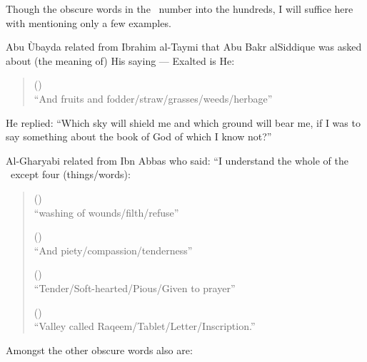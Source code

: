 \documentclass[12pt]{memoir}
\begin{document}
Though the obscure words in the \Quran\ number into the hundreds,
I will suffice here with mentioning only a few examples.

Abu \`Ubayda related from Ibrahim al-Taymi that Abu Bakr al\–Siddique
was asked about (the meaning of) His saying — Exalted is He:

\begin{quote}
() \\
“And fruits and fodder/straw/grasses/weeds/herbage”
\end{quote}

He replied: “Which sky will shield me and which ground will bear me,
if I was to say something about the book of God of which I know not?”\fnmark


Al-Gharyabi related from Ibn Abbas who said:
“I understand the whole of the \Quran\ except four (things/words):\fnmark


\begin{quote}
() \\
“washing of wounds/filth/refuse”

() \\
“And piety/compassion/tenderness”

() \\
“Tender/Soft-hearted/Pious/Given to prayer”

() \\
“Valley called Raqeem/Tablet/Letter/Inscription.”
\end{quote}

Amongst the other obscure words also are:
\end{document}
